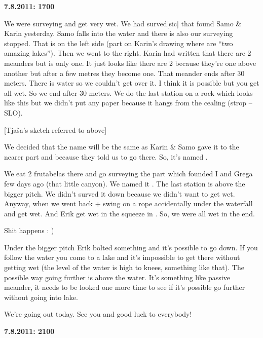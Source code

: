 \textbf{7.8.2011: 1700}

We were surveying and get very wet. We had surved[sic]  that
found Samo \& Karin yesterday. Samo falls into the water and there is
also our surveying stopped. That is on the left side (part on Karin's
drawing where are ``two amazing lakes''). Then we went to the right.
Karin had written that there are 2 meanders but is only one. It just
looks like there are 2 because they're one above another but after a few
metres they become one. That meander ends after 30 meters. There is
water so we couldn't get over it. I think it is possible but you get all
wet. So we end after 30 meters. We do the last station on a rock which
looks like this but we didn't put any paper because it hangs from the
cealing (strop -- SLO).

{[}Tjaša's sketch referred to above{]}

We decided that the name will be the same as Karin \& Samo gave it to
the nearer part and because they told us to go there. So, it's named
.

We eat 2 frutabelas there and go surveying the part which founded I and
Grega few days ago (that little canyon). We named it . The
last station is above the bigger pitch. We didn't surved it down because
we didn't want to get wet. Anyway, when we went back + swing on a rope
accidentally under the waterfall and get wet. And Erik get wet in the
squeeze in . So, we were all wet in the end.

Shit happens : )

Under the bigger pitch Erik bolted something and it's possible to go
down. If you follow the water you come to a lake and it's impossible to
get there without getting wet (the level of the water is high to knees,
something like that). The possible way going further is above the water.
It's something like passive meander, it needs to be looked one more time
to see if it's possible go further without going into lake.

We're going out today. See you and good luck to everybody!





\textbf{7.8.2011: 2100}

